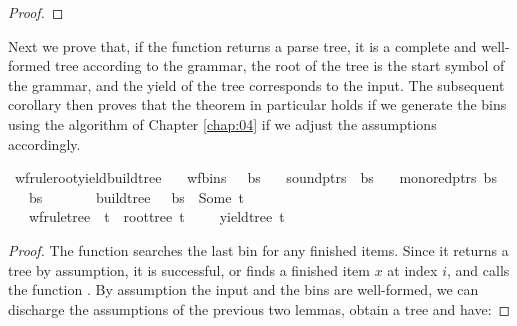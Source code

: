 \begin{isabellebody}
\begin{isamarkuptext}
\begin{proof}
\end{proof}%
\end{isamarkuptext}\isamarkuptrue%
%
\begin{isamarkuptext}%
Next we prove that, if the function  returns a parse tree, it is a complete and
well-formed tree according to the grammar, the root of the tree is the start symbol of the grammar,
and the yield of the tree corresponds to the input. The subsequent corollary then proves that the theorem
in particular holds if we generate the bins using the algorithm of Chapter \ref{chap:04} if we adjust
the assumptions accordingly.%
\end{isamarkuptext}\isamarkuptrue%
\isamarkupfalse%
\ wf{\isacharunderscore}{\kern0pt}rule{\isacharunderscore}{\kern0pt}root{\isacharunderscore}{\kern0pt}yield{\isacharunderscore}{\kern0pt}build{\isacharunderscore}{\kern0pt}tree{\isacharcolon}{\kern0pt}\isanewline
\ \ \ {\isachardoublequoteopen}wf{\isacharunderscore}{\kern0pt}bins\ {\isasymG}\ {\isasymomega}\ bs{\isachardoublequoteclose}\isanewline
\ \ \ {\isachardoublequoteopen}sound{\isacharunderscore}{\kern0pt}ptrs\ {\isasymomega}\ bs{\isachardoublequoteclose}\isanewline
\ \ \ {\isachardoublequoteopen}mono{\isacharunderscore}{\kern0pt}red{\isacharunderscore}{\kern0pt}ptrs\ bs{\isachardoublequoteclose}\isanewline
\ \ \ {\isachardoublequoteopen}{\isacharbar}{\kern0pt}bs{\isacharbar}{\kern0pt}\ {\isacharequal}{\kern0pt}\ {\isacharbar}{\kern0pt}{\isasymomega}{\isacharbar}{\kern0pt}\ {\isacharplus}{\kern0pt}\ {}{\isachardoublequoteclose}\isanewline
\ \ \ {\isachardoublequoteopen}build{\isacharunderscore}{\kern0pt}tree\ {\isasymG}\ {\isasymomega}\ bs\ {\isacharequal}{\kern0pt}\ Some\ t{\isachardoublequoteclose}\isanewline
\ \ \ {\isachardoublequoteopen}wf{\isacharunderscore}{\kern0pt}rule{\isacharunderscore}{\kern0pt}tree\ {\isasymG}\ t\ {\isasymand}\ root{\isacharunderscore}{\kern0pt}tree\ t\ {\isacharequal}{\kern0pt}\ {\isasymSS}\ {\isasymG}\ {\isasymand}\ yield{\isacharunderscore}{\kern0pt}tree\ t\ {\isacharequal}{\kern0pt}\ {\isasymomega}{\isachardoublequoteclose}%
\isadelimproof
%
\endisadelimproof
%
\isatagproof
%
\endisatagproof
{\isafoldproof}%
%
\isadelimproof
%
\endisadelimproof
%
\begin{isamarkuptext}%
\begin{proof}

The function  searches the last bin for any finished items. Since it returns
a tree by assumption, it is successful, or finds a finished item $x$ at index $i$, and calls
the function . By assumption the input and the bins are
well-formed, we can discharge the assumptions of the previous two lemmas, obtain a tree  and have:


\end{proof}
\end{isamarkuptext}
\end{isabellebody}
